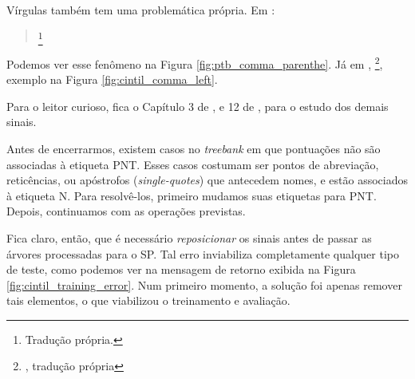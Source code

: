 Vírgulas também tem uma problemática própria. Em \cite[p~52]{bracketing_ptb}: 
\begin{quote}
    \footnote{ Tradução própria.}
\end{quote}

Podemos ver esse fenômeno na Figura \ref{fig:ptb_comma_parenthe}. Já em \cite[p~30]{cintil_handbook}, 
\footnote{, tradução própria}, exemplo na Figura \ref{fig:cintil_comma_left}.

\begin{center}
    
\end{center}

Para o leitor curioso, fica o Capítulo 3 de \cite{bracketing_ptb}, e 12 de \cite{cintil_handbook}, para o estudo dos demais sinais.

Antes de encerrarmos, existem casos no \textit{treebank} em que pontuações não são associadas à etiqueta PNT. Esses casos costumam ser pontos de abreviação, reticências, ou apóstrofos (\textit{single-quotes}) que antecedem nomes, e estão associados à etiqueta N. Para resolvê-los, primeiro mudamos suas etiquetas para PNT. Depois, continuamos com as operações previstas.

Fica claro, então, que é necessário \textit{reposicionar} os sinais antes de passar as árvores processadas para o SP. 
Tal erro inviabiliza completamente qualquer tipo de teste, como podemos ver na mensagem de retorno exibida na Figura \ref{fig:cintil_training_error}. Num primeiro momento, a solução foi apenas remover tais elementos, o que viabilizou o treinamento e avaliação.

